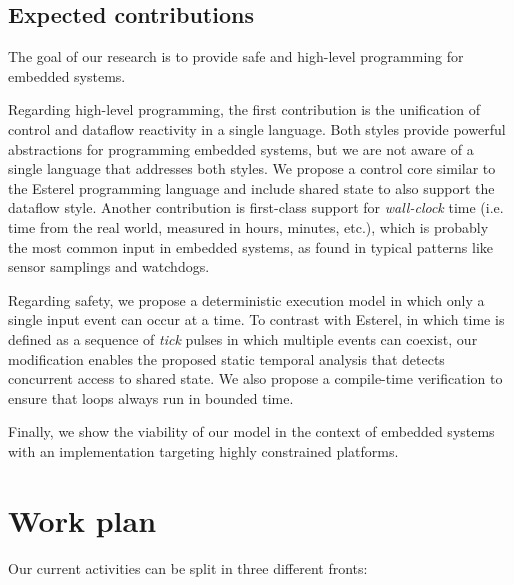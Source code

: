 \documentclass[pdftex,12pt,a4paper]{article}
\begin{document}
\subsection{Expected contributions}

The goal of our research is to provide safe and high-level programming for 
embedded systems.

Regarding high-level programming, the first contribution is the unification of 
control and dataflow reactivity in a single language.
Both styles provide powerful abstractions for programming embedded systems, but 
we are not aware of a single language that addresses both styles.
We propose a control core similar to the Esterel programming language and 
include shared state to also support the dataflow style.
Another contribution is first-class support for \emph{wall-clock} time (i.e.  
time from the real world, measured in hours, minutes, etc.), which is probably 
the most common input in embedded systems, as found in typical patterns like 
sensor samplings and watchdogs.

Regarding safety, we propose a deterministic execution model in which only a 
single input event can occur at a time.
To contrast with Esterel, in which time is defined as a sequence of \emph{tick} 
pulses in which multiple events can coexist, our modification enables the 
proposed static temporal analysis that detects concurrent access to shared 
state.
We also propose a compile-time verification to ensure that loops always run in 
bounded time.

Finally, we show the viability of our model in the context of embedded systems 
with an implementation targeting highly constrained platforms.

\section{Work plan}

Our current activities can be split in three different fronts:
\end{document}
